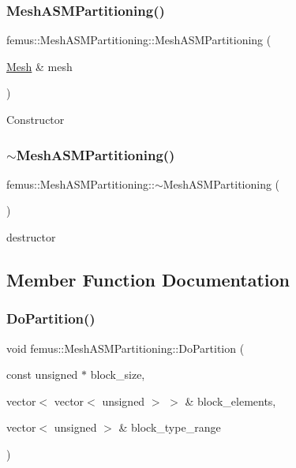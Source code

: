 \subsubsection{\texorpdfstring{Mesh\+A\+S\+M\+Partitioning()}{MeshASMPartitioning()}}
{\footnotesize\ttfamily femus\+::\+Mesh\+A\+S\+M\+Partitioning\+::\+Mesh\+A\+S\+M\+Partitioning (\begin{DoxyParamCaption}\item[{\mbox{\hyperlink{classfemus_1_1_mesh}{Mesh}} \&}]{mesh }\end{DoxyParamCaption})}

Constructor \mbox{\label{classfemus_1_1_mesh_a_s_m_partitioning_a9f0a9032ae1dde1a98b579a26dd9c3c4}} 
\subsubsection{\texorpdfstring{$\sim$\+Mesh\+A\+S\+M\+Partitioning()}{~MeshASMPartitioning()}}
{\footnotesize\ttfamily femus\+::\+Mesh\+A\+S\+M\+Partitioning\+::$\sim$\+Mesh\+A\+S\+M\+Partitioning (\begin{DoxyParamCaption}{ }\end{DoxyParamCaption})\hspace{0.3cm}{\ttfamily [inline]}}

destructor 

\subsection{Member Function Documentation}
\mbox{\label{classfemus_1_1_mesh_a_s_m_partitioning_ae322bd9c4e4308a647bb228c504db128}} 
\subsubsection{\texorpdfstring{Do\+Partition()}{DoPartition()}}
{\footnotesize\ttfamily void femus\+::\+Mesh\+A\+S\+M\+Partitioning\+::\+Do\+Partition (\begin{DoxyParamCaption}\item[{const unsigned $\ast$}]{block\+\_\+size,  }\item[{vector$<$ vector$<$ unsigned $>$ $>$ \&}]{block\+\_\+elements,  }\item[{vector$<$ unsigned $>$ \&}]{block\+\_\+type\+\_\+range }\end{DoxyParamCaption})}


